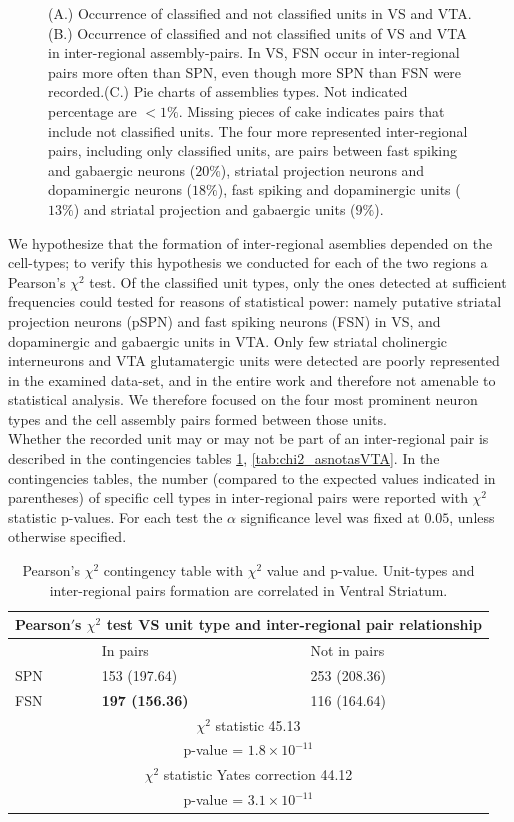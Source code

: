 \begin{figure}[H]
    \caption{(A.) Occurrence of classified and not classified units in VS and VTA. (B.) Occurrence of classified and not classified units of VS and VTA in inter-regional assembly-pairs. In VS, FSN occur in inter-regional pairs more often than SPN, even though more SPN than FSN were recorded.(C.) Pie charts of assemblies types. Not indicated percentage are $<1\%$. Missing pieces of cake indicates pairs that include not classified units. The four more represented inter-regional pairs, including only classified units, are pairs between fast spiking and gabaergic neurons ($20\%$), striatal projection neurons and dopaminergic neurons ($18\%$), fast spiking and dopaminergic units ($13\%$) and striatal projection and gabaergic units ($9\%$). }
    \label{fig:PieAssembliesTot}
\end{figure}
We hypothesize that the formation of inter-regional asemblies  depended on the cell-types; to verify this hypothesis we conducted for each of the two regions a Pearson's $\chi^2$ test. Of the classified unit types, only the ones detected at sufficient frequencies could tested for reasons of statistical power: namely putative striatal projection neurons (pSPN) and fast spiking neurons (FSN) in VS, and dopaminergic and gabaergic units in VTA. Only few striatal cholinergic interneurons and VTA glutamatergic units were detected are poorly represented in the examined data-set, and in the entire work and therefore not amenable to statistical analysis. We therefore focused on the four most prominent neuron types and the cell assembly pairs formed between those units.\\Whether the recorded unit may or may not be part of an inter-regional pair is described  in the contingencies tables \ref{tab:chi2_asnotasVS}, \ref{tab:chi2_asnotasVTA}. In the contingencies tables, the number (compared to the expected values indicated in parentheses) of specific cell types in inter-regional pairs were reported with $\chi^2$ statistic p-values. For each test the $\alpha$ significance level was fixed at $0.05$, unless otherwise specified.
\begin{table}[H]
\begin{tabular}{ |p{3cm}|p{3cm}|p{3cm}| }
 \hline
 \multicolumn{3}{|c|}{Pearson$'$s $\chi^2$ test VS unit type and inter-regional pair relationship} \\
 \hline
 & In pairs & Not in pairs\\
 \hline
 SPN & 153 (197.64) & 253 (208.36) \\
 \hline
 FSN & \textbf{197 (156.36)} & 116 (164.64)\\
 \hline
 \multicolumn{3}{|c|}{$\chi^2$ statistic  45.13}\\
 \multicolumn{3}{|c|}{p-value = $1.8\times10^{-11}$}\\
 \hline
 \multicolumn{3}{|c|}{$\chi^2$ statistic Yates correction 44.12}\\
 \multicolumn{3}{|c|}{p-value = $3.1\times10^{-11}$}\\
 \hline
\end{tabular}
\caption{Pearson's $\chi^2$ contingency table with $\chi^2$ value and p-value. Unit-types and inter-regional pairs formation are correlated in Ventral Striatum.}
\label{tab:chi2_asnotasVS}
\end{table}
